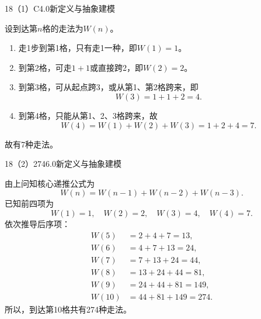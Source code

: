 \begin{solution}{18（1）}{C}{4.0}{新定义与抽象建模}

设到达第\(n\)格的走法为\(W(n)\)。
\begin{enumerate}[label=\textbf{Step \arabic*:},leftmargin=*]
  \item 走1步到第1格，只有走1一种，即\(W(1)=1\)。
  \item 到第2格，可走\(1+1\)或直接跨2，即\(W(2)=2\)。
  \item 到第3格，可从起点跨3，或从第1、第2格跨来，即
  \[
    W(3)=1+1+2=4.
  \]
  \item 到第4格，只能从第1、2、3格跨来，故
  \[
    W(4)=W(1)+W(2)+W(3)=1+2+4=7.
  \]
\end{enumerate}
故有7种走法。

\end{solution}

\begin{solution}{18（2）}{274}{6.0}{新定义与抽象建模}

由上问知核心递推公式为
\[
  W(n)=W(n-1)+W(n-2)+W(n-3).
\]
已知前四项为
\[
  W(1)=1,\quad W(2)=2,\quad W(3)=4,\quad W(4)=7.
\]
依次推导后序项：
\[
\begin{aligned}
  W(5)&=2+4+7=13,\\
  W(6)&=4+7+13=24,\\
  W(7)&=7+13+24=44,\\
  W(8)&=13+24+44=81,\\
  W(9)&=24+44+81=149,\\
  W(10)&=44+81+149=274.
\end{aligned}
\]
所以，到达第10格共有274种走法。

\end{solution}

